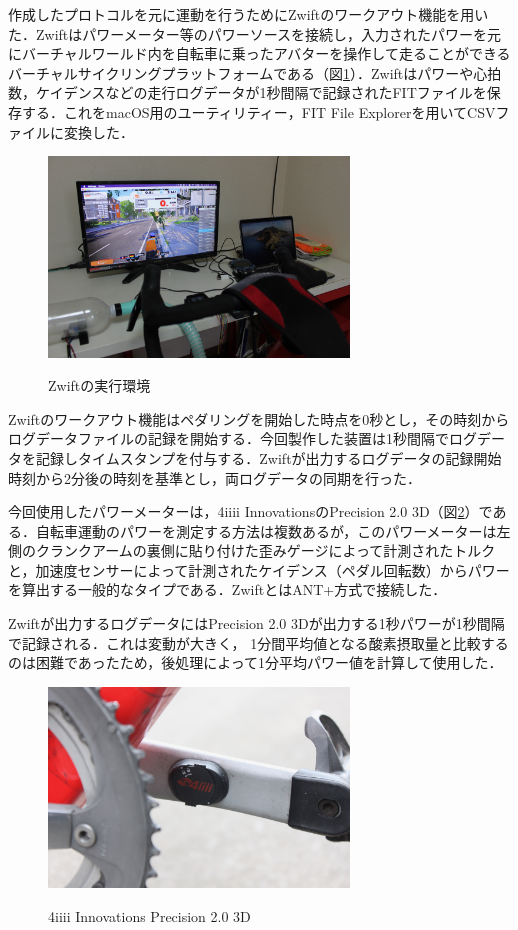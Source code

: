 作成したプロトコルを元に運動を行うためにZwiftのワークアウト機能を用いた．Zwiftはパワーメーター等のパワーソースを接続し，入力されたパワーを元にバーチャルワールド内を自転車に乗ったアバターを操作して走ることができるバーチャルサイクリングプラットフォームである（図\ref{fig:zwift}）．Zwiftはパワーや心拍数，ケイデンスなどの走行ログデータが1秒間隔で記録されたFITファイルを保存する．これをmacOS用のユーティリティー，FIT File Explorer\cite{fitfile}を用いてCSVファイルに変換した．

\begin{figure}[H]
  \begin{center}
    \label{fig:zwift}
    \includegraphics[width=8cm]{fig/zwift}
    \caption{Zwiftの実行環境}
  \end{center}
\end{figure}

Zwiftのワークアウト機能はペダリングを開始した時点を0秒とし，その時刻からログデータファイルの記録を開始する．今回製作した装置は1秒間隔でログデータを記録しタイムスタンプを付与する．Zwiftが出力するログデータの記録開始時刻から2分後の時刻を基準とし，両ログデータの同期を行った．

今回使用したパワーメーターは，4iiii InnovationsのPrecision 2.0 3D（図\ref{fig:4iiii}）である．自転車運動のパワーを測定する方法は複数あるが，このパワーメーターは左側のクランクアームの裏側に貼り付けた歪みゲージによって計測されたトルクと，加速度センサーによって計測されたケイデンス（ペダル回転数）からパワーを算出する一般的なタイプである．ZwiftとはANT+方式で接続した．

Zwiftが出力するログデータにはPrecision 2.0 3Dが出力する1秒パワーが1秒間隔で記録される．これは変動が大きく， 1分間平均値となる酸素摂取量と比較するのは困難であったため，後処理によって1分平均パワー値を計算して使用した．

\begin{figure}[H]
  \begin{center}
    \label{fig:4iiii}
    \includegraphics[width=8cm]{fig/4iiii}
    \caption{4iiii Innovations Precision 2.0 3D}
  \end{center}
\end{figure}

